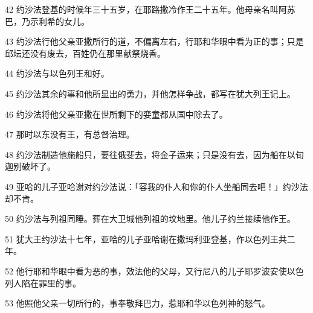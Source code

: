\par 42 约沙法登基的时候年三十五岁，在耶路撒冷作王二十五年。他母亲名叫阿苏巴，乃示利希的女儿。
\par 43 约沙法行他父亲亚撒所行的道，不偏离左右，行耶和华眼中看为正的事；只是邱坛还没有废去，百姓仍在那里献祭烧香。
\par 44 约沙法与以色列王和好。
\par 45 约沙法其余的事和他所显出的勇力，并他怎样争战，都写在犹大列王记上。
\par 46 约沙法将他父亲亚撒在世所剩下的娈童都从国中除去了。
\par 47 那时以东没有王，有总督治理。
\par 48 约沙法制造他施船只，要往俄斐去，将金子运来；只是没有去，因为船在以旬迦别破坏了。
\par 49 亚哈的儿子亚哈谢对约沙法说：「容我的仆人和你的仆人坐船同去吧！」约沙法却不肯。
\par 50 约沙法与列祖同睡。葬在大卫城他列祖的坟地里。他儿子约兰接续他作王。
\par 51 犹大王约沙法十七年，亚哈的儿子亚哈谢在撒玛利亚登基，作以色列王共二年。
\par 52 他行耶和华眼中看为恶的事，效法他的父母，又行尼八的儿子耶罗波安使以色列人陷在罪里的事。
\par 53 他照他父亲一切所行的，事奉敬拜巴力，惹耶和华以色列神的怒气。



